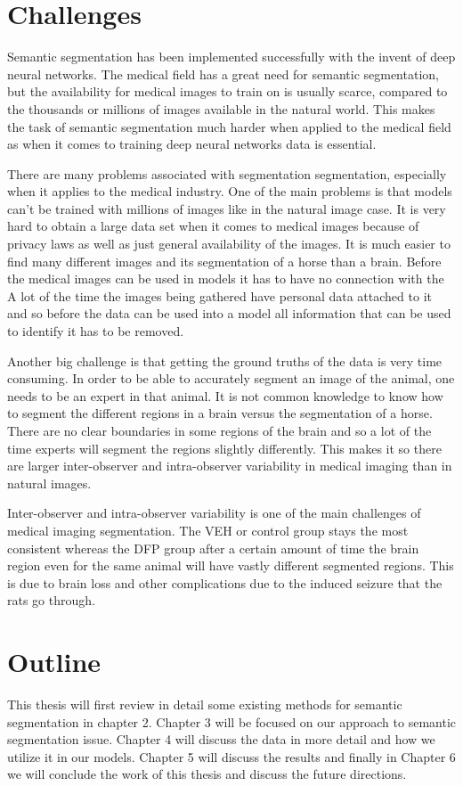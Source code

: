 \section{Challenges} 


    Semantic segmentation has been implemented successfully with the invent of deep neural networks.
    The medical field has a great need for semantic segmentation, but the availability for medical images to train on is usually scarce, compared to the thousands or millions of images available in the natural world.
    This makes the task of semantic segmentation much harder when applied to the medical field as when it comes to training deep neural networks data is essential. 
    
    There are many problems associated with segmentation segmentation, especially when it applies to the medical industry. 
    One of the main problems is that models can't be trained with millions of images like in the natural image case. 
    It is very hard to obtain a large data set when it comes to medical images because of privacy laws as well as just general availability of the images. 
    It is much easier to find many different images and its segmentation of a horse than a brain. 
    Before the medical images can be used in models it has to have no connection with the 
    A lot of the time the images being gathered have personal data attached to it and so before the data can be used into a model all information that can be used to identify it has to be removed. 
    
    Another big challenge is that getting the ground truths of the data is very time consuming. 
    In order to be able to accurately segment an image of the animal, one needs to be an expert in that animal. 
    It is not common knowledge to know how to segment the different regions in a brain versus the segmentation of a horse.
    There are no clear boundaries in some regions of the brain and so a lot of the time experts will segment the regions slightly differently. 
    This makes it so there are larger inter-observer and intra-observer variability in medical imaging than in natural images. 
    
    Inter-observer and intra-observer variability is one of the main challenges of medical imaging segmentation.
    The VEH or control group stays the most consistent whereas the DFP group after a certain amount of time the brain region even for the same animal will have vastly different segmented regions.  
    This is due to brain loss and other complications due to the induced seizure that the rats go through.  
    
 

\section{Outline}
    This thesis will first review in detail some existing methods for semantic segmentation in chapter 2. 
    Chapter 3 will be focused on our approach to semantic segmentation issue. 
    Chapter 4 will discuss the data in more detail and how we utilize it in our models. Chapter 5 will discuss the results and finally in Chapter 6 we will conclude the work of this thesis and discuss the future directions.